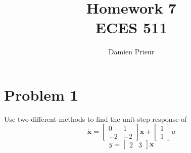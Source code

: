 \documentclass{article}
\author{Damien Prieur}
\title{Homework 7 \\ ECES 511}
\date{}
\begin{document}
\maketitle

\section*{Problem 1}
Use two different methods to find the unit-step response of
$$
\mathbf{\dot{x}}
=
\begin{bmatrix}
0 & 1 \\
-2 & -2
\end{bmatrix}
\mathbf{x}
+
\begin{bmatrix}
1\\
1
\end{bmatrix}
u
$$
$$ y = \begin{bmatrix}2 & 3 \end{bmatrix} \mathbf{x} $$
\end{document}
